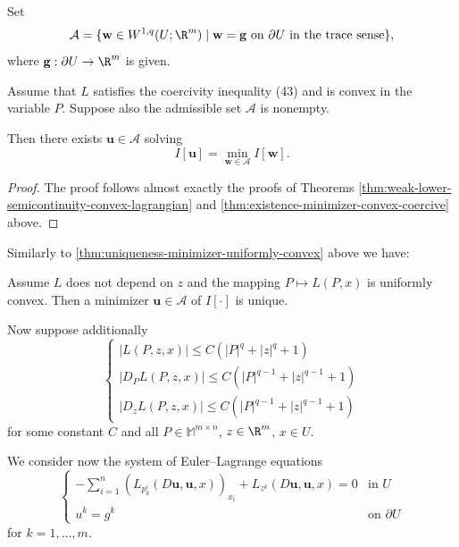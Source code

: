 \begin{definition}
\label{def:admissible-class-systems}
Set
\[
\mathcal{A} = \{\mathbf{w} \in W^{1,q}(U; \R^m) \mid \mathbf{w} = \mathbf{g} \text{ on } \partial U \text{ in the trace sense}\},
\]
where $\mathbf{g} : \partial U \to \R^m$ is given.
\end{definition}

\begin{theorem}
\label{thm:existence-minimizer-systems}
Assume that $L$ satisfies the coercivity inequality (43) and is convex in the variable $P$. Suppose also the admissible set $\mathcal{A}$ is nonempty.

Then there exists $\mathbf{u} \in \mathcal{A}$ solving
\[
I[\mathbf{u}] = \min_{\mathbf{w} \in \mathcal{A}} I[\mathbf{w}].
\]
\end{theorem}
\begin{proof}
The proof follows almost exactly the proofs of Theorems \cref{thm:weak-lower-semicontinuity-convex-lagrangian} and \cref{thm:existence-minimizer-convex-coercive} above.
\end{proof}

Similarly to \cref{thm:uniqueness-minimizer-uniformly-convex} above we have:

\begin{theorem}
\label{thm:uniqueness-minimizer-systems}
Assume $L$ does not depend on $z$ and the mapping $P \mapsto L(P, x)$ is uniformly convex. Then a minimizer $\mathbf{u} \in \mathcal{A}$ of $I[\cdot]$ is unique.
\end{theorem}

Now suppose additionally
\[
\begin{cases}
|L(P, z, x)| \le C(|P|^q + |z|^q + 1) \\
|D_P L(P, z, x)| \le C(|P|^{q-1} + |z|^{q-1} + 1) \\
|D_z L(P, z, x)| \le C(|P|^{q-1} + |z|^{q-1} + 1)
\end{cases}
\tag{44}
\]
for some constant $C$ and all $P \in \mathbb{M}^{m \times n}$, $z \in \R^m$, $x \in U$.

We consider now the system of Euler--Lagrange equations
\[
\begin{cases}
-\sum_{i=1}^n (L_{p_k^i}(D\mathbf{u}, \mathbf{u}, x))_{x_i} + L_{z^k}(D\mathbf{u}, \mathbf{u}, x) = 0 & \text{in } U \\
u^k = g^k & \text{on } \partial U
\end{cases}
\tag{45}
\]
for $k = 1, \ldots, m$.

